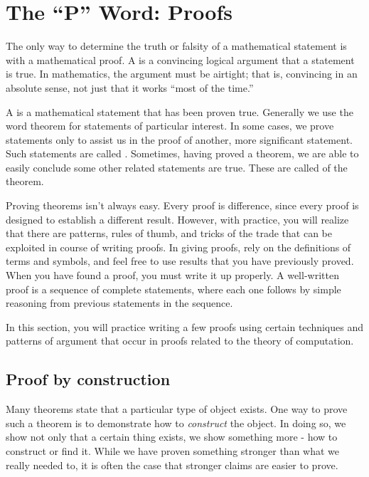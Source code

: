 \section{The ``P'' Word: Proofs}

\begin{discussion}
The only way to determine the truth or falsity of a mathematical statement is with a mathematical proof. A  is a convincing logical argument that a statement is true. In mathematics, the argument must be airtight; that is, convincing in an absolute sense, not just that it works ``most of the time.''

A  is a mathematical statement that has been proven true. Generally we use the word theorem for statements of particular interest. In some cases, we prove statements only to assist us in the proof of another, more significant statement. Such statements are called . Sometimes, having proved a theorem, we are able to easily conclude some other related statements are true. These are called  of the theorem.

Proving theorems isn't always easy. Every proof is difference, since every proof is designed to establish a different result. However, with practice, you will realize that there are patterns, rules of thumb, and tricks of the trade that can be exploited in course of writing proofs. In giving proofs, rely on the definitions of terms and symbols, and feel free to use results that you have previously proved. When you have found a proof, you must write it up properly. A well-written proof is a sequence of complete statements, where each one follows by simple reasoning from previous statements in the sequence.

In this section, you will practice writing a few proofs using certain techniques and patterns of argument that occur in proofs related to the theory of computation.
\end{discussion}

\subsection{Proof by construction}

\begin{discussion}
Many theorems state that a particular type of object exists. One way to prove such a theorem is to demonstrate how to \emph{construct} the object. In doing so, we show not only that a certain thing exists, we show something more - how to construct or find it. While we have proven something stronger than what we really needed to, it is often the case that stronger claims are easier to prove.
\end{discussion}

